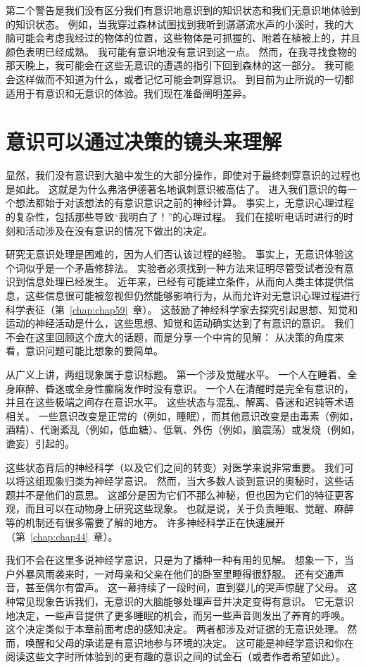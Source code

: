 第二个警告是我们没有区分我们有意识地意识到的知识状态和我们无意识地体验到的知识状态。
例如，当我穿过森林试图找到我听到潺潺流水声的小溪时，我的大脑可能会考虑我经过的物体的位置，这些物体是可抓握的、附着在植被上的，并且颜色表明已经成熟。
我可能有意识地没有意识到这一点。
然而，在我寻找食物的那天晚上，我可能会在这些无意识的遭遇的指引下回到森林的这一部分。
我可能会这样做而不知道为什么，或者记忆可能会刺穿意识。
到目前为止所说的一切都适用于有意识和无意识的体验。我们现在准备阐明差异。



\section{意识可以通过决策的镜头来理解}

显然，我们没有意识到大脑中发生的大部分操作，即使对于最终刺穿意识的过程也是如此。
这就是为什么弗洛伊德著名地讽刺意识被高估了。
进入我们意识的每一个想法都始于对该想法的有意识意识之前的神经计算。
事实上，无意识心理过程的复杂性，包括那些导致“我明白了！”的心理过程。
我们在接听电话时进行的时刻和活动涉及在没有意识的情况下做出的决定。


研究无意识处理是困难的，因为人们否认该过程的经验。
事实上，无意识体验这个词似乎是一个矛盾修辞法。
实验者必须找到一种方法来证明尽管受试者没有意识到信息处理已经发生。
近年来，已经有可能建立条件，从而向人类主体提供信息，这些信息很可能被忽视但仍然能够影响行为，从而允许对无意识心理过程进行科学表征（第~\ref{chap:chap59}~章）。
这鼓励了神经科学家去探究引起思想、知觉和运动的神经活动是什么，这些思想、知觉和运动确实达到了有意识的意识。
我们不会在这里回顾这个庞大的话题，而是分享一个中肯的见解：
从决策的角度来看，意识问题可能比想象的要简单。


从广义上讲，两组现象属于意识标题。
第一个涉及觉醒水平。
一个人在睡着、全身麻醉、昏迷或全身性癫痫发作时没有意识。
一个人在清醒时是完全有意识的，并且在这些极端之间存在意识水平。
这些状态与混乱、解离、昏迷和迟钝等术语相关。
一些意识改变是正常的（例如，睡眠），而其他意识改变是由毒素（例如，酒精）、代谢紊乱（例如，低血糖）、低氧、外伤（例如，脑震荡）或发烧（例如，谵妄）引起的。


这些状态背后的神经科学（以及它们之间的转变）对医学来说非常重要。
我们可以将这组现象归类为神经学意识。
然而，当大多数人谈到意识的奥秘时，这些话题并不是他们的意思。
这部分是因为它们不那么神秘，但也因为它们的特征更客观，而且可以在动物身上研究这些现象。
也就是说，关于负责睡眠、觉醒、麻醉等的机制还有很多需要了解的地方。
许多神经科学正在快速展开（第~\ref{chap:chap44}~章）。


我们不会在这里多说神经学意识，只是为了播种一种有用的见解。
想象一下，当户外暴风雨袭来时，一对母亲和父亲在他们的卧室里睡得很舒服。
还有交通声音，甚至偶尔有雷声。
这一幕持续了一段时间，直到婴儿的哭声惊醒了父母。
这种常见现象告诉我们，无意识的大脑能够处理声音并决定变得有意识。
它无意识地决定，一些声音提供了更多睡眠的机会，而另一些声音则发出了养育的呼唤。
这个决定类似于本章前面考虑的感知决定。 两者都涉及对证据的无意识处理。
然而，唤醒和父母的承诺是有意识地参与环境的决定。
这可能是神经学意识和你在阅读这些文字时所体验到的更有趣的意识之间的试金石（或者作者希望如此）。


